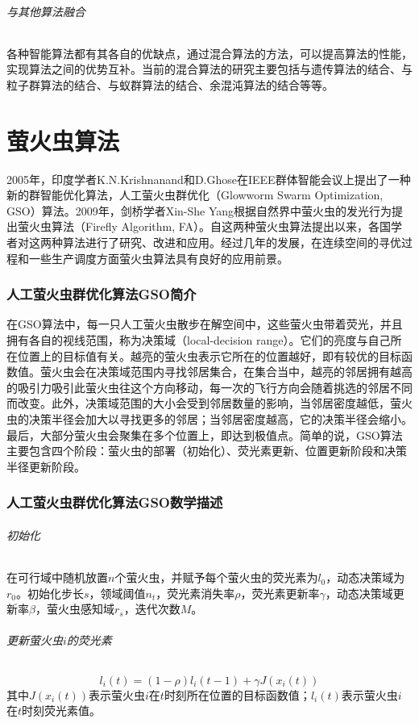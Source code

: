 \documentclass[UTF8]{ctexart}
\begin{document}
			\paragraph{与其他算法融合}
				各种智能算法都有其各自的优缺点，通过混合算法的方法，可以提高算法的性能，实现算法之间的优势互补。当前的混合算法的研究主要包括与遗传算法的结合、与粒子群算法的结合、与蚁群算法的结合、余混沌算法的结合等等。


\part{萤火虫算法}
	2005年，印度学者K.N.Krishnanand和D.Ghose在IEEE群体智能会议上提出了一种新的群智能优化算法，人工萤火虫群优化（Glowworm Swarm Optimization, GSO）算法。2009年，剑桥学者Xin-She Yang根据自然界中萤火虫的发光行为提出萤火虫算法（Firefly Algorithm, FA）。自这两种萤火虫算法提出以来，各国学者对这两种算法进行了研究、改进和应用。经过几年的发展，在连续空间的寻优过程和一些生产调度方面萤火虫算法具有良好的应用前景。
	\section{人工萤火虫群优化算法GSO简介}
	在GSO算法中，每一只人工萤火虫散步在解空间中，这些萤火虫带着荧光，并且拥有各自的视线范围，称为决策域（local-decision range）。它们的亮度与自己所在位置上的目标值有关。越亮的萤火虫表示它所在的位置越好，即有较优的目标函数值。萤火虫会在决策域范围内寻找邻居集合，在集合当中，越亮的邻居拥有越高的吸引力吸引此萤火虫往这个方向移动，每一次的飞行方向会随着挑选的邻居不同而改变。此外，决策域范围的大小会受到邻居数量的影响，当邻居密度越低，萤火虫的决策半径会加大以寻找更多的邻居；当邻居密度越高，它的决策半径会缩小。最后，大部分萤火虫会聚集在多个位置上，即达到极值点。简单的说，GSO算法主要包含四个阶段：萤火虫的部署（初始化）、荧光素更新、位置更新阶段和决策半径更新阶段。
	\section{人工萤火虫群优化算法GSO数学描述}

\paragraph{初始化}
在可行域中随机放置$n$个萤火虫，并赋予每个萤火虫的荧光素为$l_0$，动态决策域为$r_0$。初始化步长$s$，领域阈值$n_t$，荧光素消失率$\rho$，荧光素更新率$\gamma$，动态决策域更新率$\beta$，萤火虫感知域$r_s$，迭代次数$M$。
\paragraph{更新萤火虫$i$的荧光素}
$$l_i(t)=(1-\rho)l_i(t-1)+\gamma J(x_i(t))$$
其中$J(x_i(t))$表示萤火虫$i$在$t$时刻所在位置的目标函数值；$l_i(t)$表示萤火虫$i$在$t$时刻荧光素值。
\end{document}
